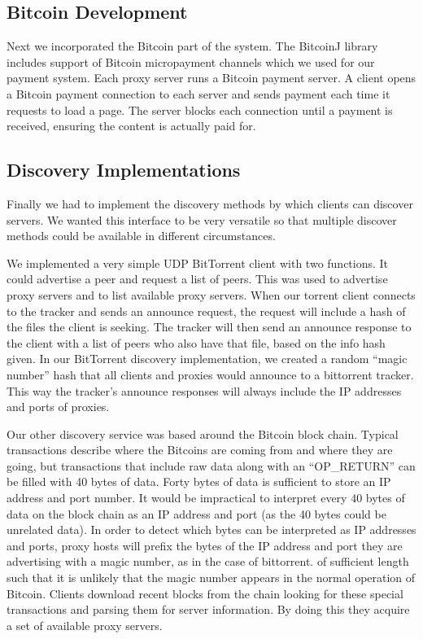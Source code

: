 \subsection{Bitcoin Development}
Next we incorporated the Bitcoin part of the system. The BitcoinJ library includes support of Bitcoin micropayment channels which we used for our payment system. Each proxy server runs a Bitcoin payment server. A client opens a Bitcoin payment connection to each server and sends payment each time it requests to load a page. The server blocks each connection until a payment is received, ensuring the content is actually paid for.

\subsection{Discovery Implementations}
Finally we had to implement the discovery methods by which clients can discover servers. We wanted this interface to be very versatile so that multiple discover methods could be available in different circumstances.

We implemented a very simple UDP BitTorrent client with two functions. It could advertise a peer and request a list of peers. This was used to advertise proxy servers and to list available proxy servers. When our torrent client connects to the tracker and sends an announce request, the request will include a hash of the files the client is seeking. The tracker will then send an announce response to the client with a list of peers who also have that file, based on the info hash given. In our BitTorrent discovery implementation, we created a random ``magic number'' hash that all clients and proxies would announce to a bittorrent tracker. This way the tracker's announce responses will always include the IP addresses and ports of proxies.

Our other discovery service was based around the Bitcoin block chain. Typical transactions describe where the Bitcoins are coming from and where they are going, but transactions that include raw data along with an ``OP\_RETURN'' can be filled with 40 bytes of data. Forty bytes of data is sufficient to store an IP address and port number. It would be impractical to interpret every 40 bytes of data on the block chain as an IP address and port (as the 40 bytes could be unrelated data). In order to detect which bytes can be interpreted as IP addresses and ports, proxy hosts will prefix the bytes of the IP address and port they are advertising with a magic number, as in the case of bittorrent. of sufficient length such that it is unlikely that the magic number appears in the normal operation of Bitcoin. Clients download recent blocks from the chain looking for these special transactions and parsing them for server information. By doing this they acquire a set of available proxy servers.

